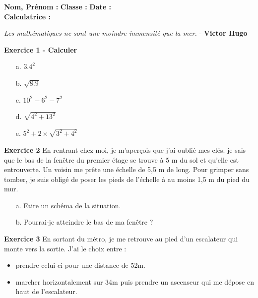 \documentclass[12pt]{article}
\begin{document}

\textbf{Nom, Prénom :} \hspace{8cm} \textbf{Classe :} \hspace{3cm} \textbf{Date :}\\
\textbf{Calculatrice :}

\begin{center}
\textit{Les mathématiques ne sont une moindre immensité que la mer.} - \textbf{Victor Hugo}
\end{center}



\begin{multicols}{2}
\textbf{Exercice 1 - Calculer}

\begin{enumerate}
\item[a.] $3.4^2$
\item[b.] $\sqrt{8.9}$
\item[c.] $10^2 - 6^2 - 7^2$
\item[d.] $\sqrt{4^2 + 13^2}$
\item[e.] $5^2 + 2 \times \sqrt{3^2 + 4^2}$
\end{enumerate}
\end{multicols}



\textbf{Exercice 2} 
En rentrant chez moi, je m'aperçois que j'ai oublié mes clés. je sais que le bas de la fenêtre du premier étage se trouve à 5 m du sol et qu'elle est entrouverte. Un voisin me prête une échelle de 5,5 m de long. Pour grimper sans tomber, je suis obligé de poser les pieds de l'échelle à au moins 1,5 m du pied du mur. 

\begin{enumerate}
\item[a.] Faire un schéma de la situation. 
\item[b.] Pourrai-je atteindre le bas de ma fenêtre ?
\end{enumerate}


\textbf{Exercice 3} 
En sortant du métro, je me retrouve au pied d'un escalateur qui monte vers la sortie. J'ai le choix entre : 
\begin{itemize}
\item prendre celui-ci pour une distance de 52m.
\item marcher horizontalement sur 34m puis prendre un ascenseur qui me dépose en haut de l'escalateur.
\end{itemize} 
\end{document}
